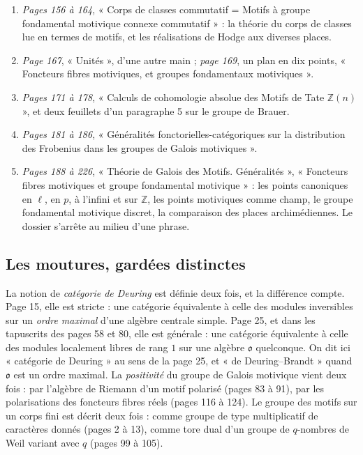 \documentclass[11pt,a4paper]{article}
\begin{document}
\begin{enumerate}
  structures CM et les homomorphismes $\Psi_{\Sigma}$, un calcul de
  $H^{1}(\mathbb{Q}, T)$.
  \item \emph{Pages 156 à 164}, « Corps de classes commutatif = Motifs à
  groupe fondamental motivique connexe commutatif » : la théorie du corps de
  classes lue en termes de motifs, et les réalisations de Hodge aux diverses
  places.
  \item \emph{Page 167}, « Unités », d'une autre main ; \emph{page 169}, un
  plan en dix points, « Foncteurs fibres motiviques, et groupes fondamentaux
  motiviques ».
  \item \emph{Pages 171 à 178}, « Calculs de cohomologie absolue des Motifs de
  Tate $\mathbb{Z}(n)$ », et deux feuillets d'un paragraphe 5 sur le groupe
  de Brauer.
  \item \emph{Pages 181 à 186}, « Généralités fonctorielles-catégoriques sur
  la distribution des Frobenius dans les groupes de Galois motiviques ».
  \item \emph{Pages 188 à 226}, « Théorie de Galois des Motifs. Généralités »,
  « Foncteurs fibres motiviques et groupe fondamental motivique » : les points
  canoniques en $\ell$, en $p$, à l'infini et sur $\mathbb{Z}$, les points
  motiviques comme champ, le groupe fondamental motivique discret, la
  comparaison des places archimédiennes. Le dossier s'arrête au milieu d'une
  phrase.
\end{enumerate}

\subsection*{Les moutures, gardées distinctes}

La notion de \emph{catégorie de Deuring} est définie deux fois, et la
différence compte. Page 15, elle est stricte : une catégorie équivalente à
celle des modules inversibles sur un \emph{ordre maximal} d'une algèbre
centrale simple. Page 25, et dans les tapuscrits des pages 58 et 80, elle
est générale : une catégorie équivalente à celle des modules localement
libres de rang $1$ sur une algèbre $\mathfrak{o}$ quelconque. On dit ici
« catégorie de Deuring » au sens de la page 25, et « de Deuring--Brandt »
quand $\mathfrak{o}$ est un ordre maximal. La \emph{positivité} du groupe de
Galois motivique vient deux fois : par l'algèbre de Riemann d'un motif
polarisé (pages 83 à 91), par les polarisations des foncteurs fibres réels
(pages 116 à 124). Le groupe des motifs sur un corps fini est décrit deux
fois : comme groupe de type multiplicatif de caractères donnés (pages 2 à 13),
comme tore dual d'un groupe de $q$-nombres de Weil variant avec $q$ (pages 99
à 105).
\end{document}
